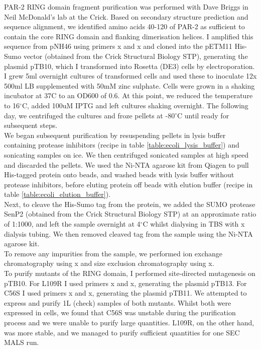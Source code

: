 \documentclass[12pt]{"report"}
\begin{document}
PAR-2 RING domain fragment purification was performed with Dave Briggs in Neil McDonald's lab at the Crick. Based on secondary structure prediction and sequence alignment, we identified amino acids 40-120 of PAR-2 as sufficient to contain the core RING domain and flanking dimerisation helices. I amplified this sequence from pNH46 using primers x and x and cloned into the pETM11 His-Sumo vector (obtained from the Crick Structural Biology STP), generating the plasmid pTB10, which I transformed into Rosetta (DE3) cells by electroporation.\\

I grew 5ml overnight cultures of transformed cells and used these to inoculate 12x 500ml LB supplemented with 50mM zinc sulphate. Cells were grown in a shaking incubator at 37C to an OD600 of 0.6. At this point, we reduced the temperature to 16$^{\circ}$C, added 100uM IPTG and left cultures shaking overnight. The following day, we centrifuged the cultures and froze pellets at -80$^{\circ}$C until ready for subsequent steps.\\

We began subsequent purification by resuspending pellets in lysis buffer containing protease inhibitors (recipe in table \ref{table:ecoli_lysis_buffer}) and sonicating samples on ice. We then centrifuged sonicated samples at high speed and discarded the pellets. We used the Ni-NTA agarose kit from Qiagen to pull His-tagged protein onto beads, and washed beads with lysis buffer without protease inhibitors, before eluting protein off beads with elution buffer (recipe in table \ref{table:ecoli_elution_buffer}).\\

Next, to cleave the His-Sumo tag from the protein, we added the SUMO protease SenP2 (obtained from the Crick Structural Biology STP) at an approximate ratio of 1:1000, and left the sample overnight at 4$^{\circ}$C whilst dialysing in TBS with x dialysis tubing. We then removed cleaved tag from the sample using the Ni-NTA agarose kit.\\

To remove any impurities from the sample, we performed ion exchange chromatography using x and size exclusion chromatography using x.\\

To purify mutants of the RING domain, I performed site-directed mutagenesis on pTB10. For L109R I used primers x and x, generating the plasmid pTB13. For C56S I used primers x and x, generating the plasmid pTB11. We attempted to express and purify 1L (check) samples of both mutants. Whilst both were expressed in cells, we found that C56S was unstable during the purification process and we were unable to purify large quantities. L109R, on the other hand, was more stable, and we managed to purify sufficient quantities for one SEC MALS run.\\
\end{document}
